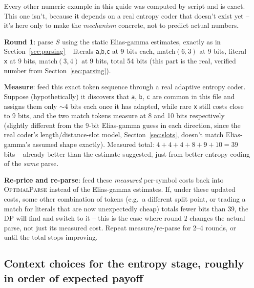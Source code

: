 \documentclass[11pt]{article}
\begin{document}
\begin{tcolorbox}[colback=orange!5!white,colframe=orange!70!black,title={Illustrative example (hypothetical numbers -- not measured, unlike every other worked example in this document)}]
Every other numeric example in this guide was computed by script and is exact. This one
isn't, because it depends on a real entropy coder that doesn't exist yet -- it's here
only to make the \emph{mechanism} concrete, not to predict actual numbers.

\textbf{Round 1}: parse $S$ using the static Elias-gamma estimates, exactly as in
Section~\ref{sec:parsing} -- literals \texttt{a},\texttt{b},\texttt{c} at 9 bits each,
match$(6,3)$ at 9 bits, literal \texttt{x} at 9 bits, match$(3,4)$ at 9 bits, total 54
bits (this part is the real, verified number from Section~\ref{sec:parsing}).

\textbf{Measure}: feed this exact token sequence through a real adaptive entropy coder.
Suppose (hypothetically) it discovers that \texttt{a}, \texttt{b}, \texttt{c} are
common in this file and assigns them only $\sim$4 bits each once it has adapted, while
rare \texttt{x} still costs close to 9 bits, and the two match tokens measure at 8 and
10 bits respectively (slightly different from the 9-bit Elias-gamma guess in each
direction, since the real coder's length/distance-slot model, Section~\ref{sec:slots},
doesn't match Elias-gamma's assumed shape exactly). Measured total: $4{+}4{+}4{+}8{+}9{+}10 = 39$ bits
-- already better than the estimate suggested, just from better entropy coding of the
\emph{same} parse.

\textbf{Re-price and re-parse}: feed these \emph{measured} per-symbol costs back into
\textsc{OptimalParse} instead of the Elias-gamma estimates. If, under these updated
costs, some other combination of tokens (e.g.\ a different split point, or trading a
match for literals that are now unexpectedly cheap) totals fewer bits than 39, the DP
will find and switch to it -- this is the case where round 2 changes the actual parse,
not just its measured cost. Repeat measure/re-parse for 2--4 rounds, or until the total
stops improving.
\end{tcolorbox}

\subsection{Context choices for the entropy stage, roughly in order of expected payoff}
\end{document}
